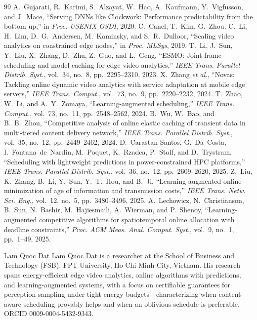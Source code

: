 ﻿\documentclass[lettersize,journal]{IEEEtran}
\begin{document}
\begin{thebibliography}{99}
 A.~Gujarati, R.~Karimi, S.~Alzayat, W.~Hao, A.~Kaufmann, Y.~Vigfusson, and J.~Mace, ``Serving DNNs like Clockwork: Performance predictability from the bottom up,'' in \emph{Proc. USENIX OSDI}, 2020.
 C.~Canel, T.~Kim, G.~Zhou, C.~Li, H.~Lim, D.~G.~Andersen, M.~Kaminsky, and S.~R.~Dulloor, ``Scaling video analytics on constrained edge nodes,'' in \emph{Proc. MLSys}, 2019.
 T.~Li, J.~Sun, Y.~Liu, X.~Zhang, D.~Zhu, Z.~Guo, and L.~Geng, ``ESMO: Joint frame scheduling and model caching for edge video analytics,'' \emph{IEEE Trans. Parallel Distrib. Syst.}, vol.~34, no.~8, pp.~2295--2310, 2023.
 X.~Zhang \emph{et al.}, ``Novas: Tackling online dynamic video analytics with service adaptation at mobile edge servers,'' \emph{IEEE Trans. Comput.}, vol.~73, no.~9, pp.~2220--2232, 2024.
 T.~Zhao, W.~Li, and A.~Y.~Zomaya, ``Learning-augmented scheduling,'' \emph{IEEE Trans. Comput.}, vol.~73, no.~11, pp.~2548--2562, 2024.
 B.~Wu, W.~Bao, and B.~B.~Zhou, ``Competitive analysis of online elastic caching of transient data in multi-tiered content delivery network,'' \emph{IEEE Trans. Parallel Distrib. Syst.}, vol.~35, no.~12, pp.~2449--2462, 2024.
 D.~Carastan-Santos, G.~Da~Costa, I.~Fontana~de~Nardin, M.~Poquet, K.~Rzadca, P.~Stolf, and D.~Trystram, ``Scheduling with lightweight predictions in power-constrained HPC platforms,'' \emph{IEEE Trans. Parallel Distrib. Syst.}, vol.~36, no.~12, pp.~2609--2620, 2025.
 Z.~Liu, K.~Zhang, B.~Li, Y.~Sun, Y.~T.~Hou, and B.~Ji, ``Learning-augmented online minimization of age of information and transmission costs,'' \emph{IEEE Trans. Netw. Sci. Eng.}, vol.~12, no.~5, pp.~3480--3496, 2025.
 A.~Lechowicz, N.~Christianson, B.~Sun, N.~Bashir, M.~Hajiesmaili, A.~Wierman, and P.~Shenoy, ``Learning-augmented competitive algorithms for spatiotemporal online allocation with deadline constraints,'' \emph{Proc. ACM Meas. Anal. Comput. Syst.}, vol.~9, no.~1, pp.~1--49, 2025.
\end{thebibliography}

\begin{IEEEbiographynophoto}{Lam Quoc Dat}
Lam Quoc Dat is a researcher at the School of Business and Technology (FSB), FPT University, Ho Chi Minh City, Vietnam. His research spans energy-efficient edge video analytics, online algorithms with predictions, and learning-augmented systems, with a focus on certifiable guarantees for perception sampling under tight energy budgets---characterizing when content-aware scheduling provably helps and when an oblivious schedule is preferable. ORCID 0009-0004-5432-9343.
\end{IEEEbiographynophoto}
\end{document}
